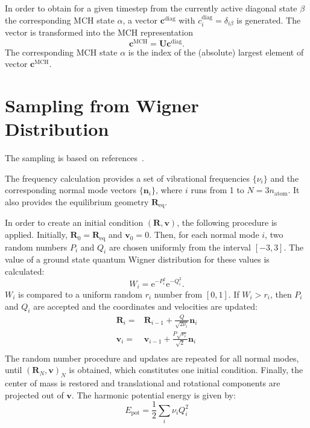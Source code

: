 \documentclass[a4paper,11pt,DIV=15,openany,twoside=false]{scrbook}
\newcommand{\E}{\ensuremath{\mathrm{e}}}
\newcommand{\VEC}[1]{\ensuremath{\mathbf{#1}}}
\begin{document}
In order to obtain for a given timestep from the currently active diagonal state $\beta$ the corresponding MCH state $\alpha$, a vector $\VEC{c}^\text{diag}$ with $c_i^\text{diag}=\delta_{i\beta}$ is generated. The vector is transformed into the MCH representation
\begin{equation}
  \VEC{c}^\text{MCH}=\VEC{U}\VEC{c}^\text{diag}.
\end{equation}
The corresponding MCH state $\alpha$ is the index of the (absolute) largest element of vector $\VEC{c}^\text{MCH}$.


\section{Sampling from Wigner Distribution}\label{met:wigner}

The sampling is based on references~\cite{Dahl1988JCP, Schinke1995}.

The frequency calculation provides a set of vibrational frequencies $\{\nu_i\}$ and the corresponding normal mode vectors $\{\VEC{n}_i\}$, where $i$ runs from 1 to $N=3n_{\text{atom}}$. It also provides the equilibrium geometry $\VEC{R}_{\text{eq}}$.

In order to create an initial condition $(\VEC{R},\VEC{v})$, the following procedure is applied. Initially, $\VEC{R}_0=\VEC{R}_{\text{eq}}$ and $\VEC{v}_0=0$. Then, for each normal mode $i$, two random numbers $P_i$ and $Q_i$ are chosen uniformly from the interval $[-3,3]$. The value of a ground state quantum Wigner distribution for these values is calculated:
\begin{equation}
  W_i=\E^{-P_i^2}\E^{-Q_i^2}.
\end{equation}
$W_i$ is compared to a uniform random $r_i$ number from $[0,1]$. If $W_i>r_i$, then $P_i$ and $Q_i$ are accepted and the coordinates and velocities are updated:
\begin{align}
  \VEC{R}_i=&\VEC{R}_{i-1} + \frac{Q}{\sqrt{2\nu_i}}\VEC{n}_i\\
  \VEC{v}_i=&\VEC{v}_{i-1} + \frac{P\sqrt{\nu_i}}{\sqrt{2}}\VEC{n}_i\\
\end{align}
The random number procedure and updates are repeated for all normal modes, until $(\VEC{R}_N,\VEC{v})_N$ is obtained, which constitutes one initial condition. Finally, the center of mass is restored and translational and rotational components are projected out of $\VEC{v}$. The harmonic potential energy is given by:
\begin{equation}
  E_{\text{pot}}=\frac{1}{2}\sum\limits_i \nu_iQ_i^2
\end{equation}
\end{document}
